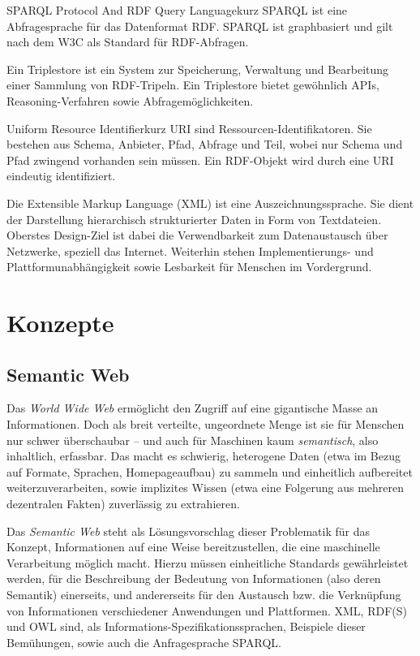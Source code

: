 {\glqq SPARQL Protocol And RDF Query Language\grqq kurz SPARQL ist eine Abfragesprache für das Datenformat RDF. SPARQL ist graphbasiert und gilt nach dem W3C als Standard für RDF-Abfragen. \cite{w3c-rdf-sparql-query,sparql-wiki}}

{Ein Triplestore ist ein System zur Speicherung, Verwaltung und Bearbeitung einer
 Sammlung von RDF-Tripeln. Ein Triplestore bietet gewöhnlich APIs,
 Rea\-so\-ning-Verfahren sowie Abfragemöglichkeiten. \cite{fraunhofer}}

{\glqq Uniform Resource Identifier\grqq kurz URI sind Ressourcen-Identifikatoren. Sie bestehen 
aus Schema, Anbieter, Pfad, Abfrage und Teil, wobei nur Schema und Pfad zwingend 
vorhanden sein müssen. Ein RDF-Objekt wird durch eine URI eindeutig identifiziert. \cite{uri}}

{Die Extensible Markup Language (XML) ist eine Auszeichnungssprache. Sie dient der Darstellung hierarchisch strukturierter Daten in Form von Textdateien. Oberstes Design-Ziel ist dabei die Verwendbarkeit zum Datenaustausch über Netzwerke, speziell das Internet. Weiterhin stehen Implementierungs- und Plattformunabhängigkeit sowie Lesbarkeit für Menschen im Vordergrund.
\cite{xml}
}




\section{Konzepte}

\subsection{Semantic Web}

Das \emph{World Wide Web} ermöglicht den Zugriff auf eine gigantische Masse an Informationen. Doch als breit verteilte, ungeordnete Menge ist sie für Menschen nur schwer überschaubar – und auch für Maschinen kaum \emph{semantisch}, also inhaltlich, erfassbar. Das macht es schwierig, heterogene Daten (etwa im Bezug auf Formate, Sprachen, Homepageaufbau) zu sammeln und einheitlich aufbereitet weiterzuverarbeiten, sowie implizites Wissen (etwa eine Folgerung aus mehreren dezentralen Fakten) zuverlässig zu extrahieren.

Das \emph{Semantic Web} steht als Lösungsvorschlag dieser Problematik für das Konzept, Informationen auf eine Weise bereitzustellen, die eine maschinelle Verarbeitung möglich macht. Hierzu müssen einheitliche Standards gewährleistet werden, für die Beschreibung der Bedeutung von Informationen (also deren Semantik) einerseits, und andererseits für den Austausch bzw. die Verknüpfung von Informationen verschiedener Anwendungen und Plattformen. XML, RDF(S) und OWL sind, als Informations-Spezifikationssprachen, Beispiele dieser Bemühungen, sowie auch die Anfragesprache SPARQL. \cite{hitzler}

